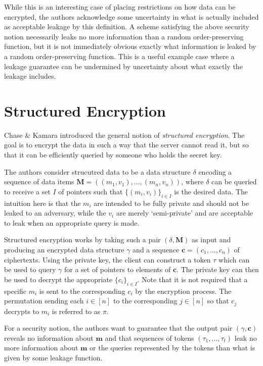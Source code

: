 \documentclass[11pt, pdftex]{article}
\begin{document}
While this is an interesting case of placing restrictions on how data can be encrypted, the authors acknowledge some uncertainty in what is actually included as acceptable leakage by this definition. A scheme satisfying the above security notion necessarily leaks no more information than a random order-preserving function, but it is not immediately obvious exactly what information is leaked by a random order-preserving function. This is a useful example case where a leakage guarantee can be undermined by uncertainty about what exactly the leakage includes.

\section{Structured Encryption}

Chase \& Kamara \cite{str_enc} introduced the general notion of {\em structured encryption}. The goal is to encrypt the data in such a way that the server cannot read it, but so that it can be efficiently queried by someone who holds the secret key.

The authors consider strucutred data to be a data structure $\delta$ encoding a sequence of data items $\mathbf{M} = ((m_1,v_1), \ldots, (m_n,v_n))$, where $\delta$ can be queried to receive a set $I$ of pointers such that $\{(m_i,v_i)\}_{i \in I}$ is the desired data. The intuition here is that the $m_i$ are intended to be fully private and should not be leaked to an adversary, while the $v_i$ are merely `semi-private' and are acceptable to leak when an appropriate query is made.

Structured encryption works by taking such a pair $(\delta,\mathbf{M})$ as input and producing an encrypted data structure $\gamma$ and a sequence $\mathbf{c} = (c_1, \ldots, c_n)$ of ciphertexts. Using the private key, the client can construct a token $\tau$ which can be used to query $\gamma$ for a set of pointers to elements of $\mathbf{c}$. The private key can then be used to decrypt the appropriate $\{c_i\}_{i \in I}$. Note that it is not required that a specific $m_i$ is sent to the corresponding $c_i$ by the encryption process. The permutation sending each $i \in [n]$ to the corresponding $j \in [n]$ so that $c_j$ decrypts to $m_i$ is referred to as $\pi$.

For a security notion, the authors want to guarantee that the output pair $(\gamma, \mathbf{c})$ reveals no information about $\mathbf{m}$ and that sequences of tokens $(\tau_1, \ldots, \tau_t)$ leak no more information about $\mathbf{m}$ or the queries represented by the tokens than what is given by some leakage function.
\end{document}
